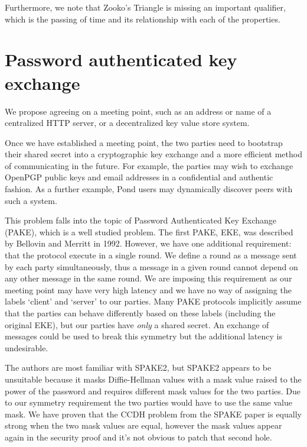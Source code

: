 \documentclass[letterpaper,twocolumn,10pt]{article}
\begin{document}
Furthermore, we note that Zooko's Triangle is missing an important qualifier,
which is the passing of time and its relationship with each of the properties.

\section{Password authenticated key exchange}

We propose agreeing on a meeting point, such as an address or name of a
centralized HTTP server, or a decentralized key value store system.

Once we have established a meeting point, the two parties need to bootstrap
their shared secret into a cryptographic key exchange and a more efficient
method of communicating in the future. For example, the parties may wish to
exchange OpenPGP public keys and email addresses in a confidential and
authentic fashion. As a further example, Pond users may dynamically discover
peers with such a system.

This problem falls into the topic of Password Authenticated Key Exchange
(PAKE), which is a well studied problem. The first PAKE, EKE, was described by
Bellovin and Merritt\cite{bellovin1992encrypted} in 1992. However, we have one
additional requirement: that the protocol execute in a single round. We define
a round as a message sent by each party simultaneously, thus a message in a
given round cannot depend on any other message in the same round. We are
imposing this requirement as our meeting point may have very high latency and
we have no way of assigning the labels `client' and `server' to our parties.
Many PAKE protocols implicitly assume that the parties can behave differently
based on these labels (including the original EKE), but our parties have {\it
only} a shared secret. An exchange of messages could be used to break this
symmetry but the additional latency is undesirable.

The authors are most familiar with SPAKE2\cite{abdalla2005simple}, but SPAKE2
appears to be unsuitable because it masks Diffie-Hellman values with a mask
value raised to the power of the password and requires different mask values
for the two parties. Due to our symmetry requirement the two parties would have
to use the same value mask. We have proven that the CCDH problem from the SPAKE
paper is equally strong when the two mask values are equal, however the mask
values appear again in the security proof and it's not obvious to patch that
second hole.
\end{document}
